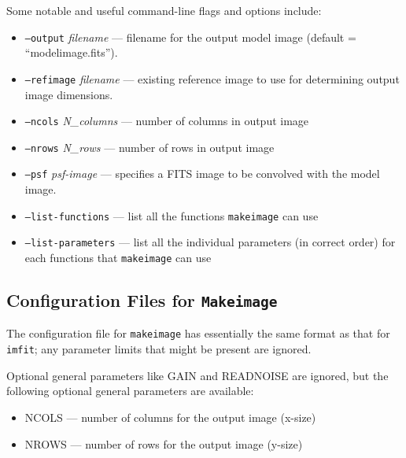 \documentclass[10pt]{article}
\newcommand{\imfit}{\texttt{imfit}}
\newcommand{\makeimage}{\texttt{makeimage}}
\newcommand{\Makeimage}{\texttt{Makeimage}}
\begin{document}
Some notable and useful command-line flags and options include:
\begin{itemize}
\item \texttt{--output} \textit{filename} --- filename for the output model
image (default = ``modelimage.fits'').

\item \texttt{--refimage} \textit{filename} --- existing reference image to
use for determining output image dimensions.

\item \texttt{--ncols} \textit{N\_columns} --- number of columns in output image

\item \texttt{--nrows} \textit{N\_rows} --- number of rows in output image

\bigskip

\item \texttt{--psf} \textit{psf-image} --- specifies a FITS image to be convolved
with the model image.

\bigskip

\item \texttt{--list-functions} --- list all the functions \makeimage{}
can use

\item \texttt{--list-parameters} --- list all the individual parameters (in correct order)
for each functions that \makeimage{} can use


\end{itemize}



\subsection{Configuration Files for \Makeimage{}}

The configuration file for \makeimage{} has essentially the same format as
that for \imfit; any parameter limits that might be present are ignored.

Optional general parameters like GAIN and READNOISE are ignored, but the
following optional general parameters are available:

\begin{itemize}
\item NCOLS --- number of columns for the output image (x-size)

\item NROWS --- number of rows for the output image (y-size)

\end{itemize}
\end{document}
